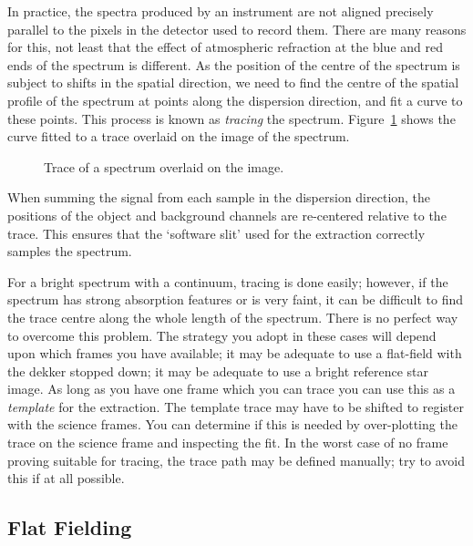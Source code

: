 \documentclass[twoside,11pt]{article}
\newcommand{\htmlref}[2]{#1}
\newcommand{\xlabel}[1]{}
\newcommand{\mlabel}[1]{\xlabel{#1}\label{#1}}
\newcommand{\scspec}[2]{#1}
\newcommand{\scspec}[2]{#2}
\begin{document}
In practice, the spectra produced by an instrument are not aligned
precisely parallel to the pixels in the detector used to record them.
There are many reasons for this, not least that the effect of
atmospheric refraction at the blue and red ends of the spectrum is
different.
As the position of the centre of the spectrum is subject to shifts in the
spatial direction, we need to find the centre of the spatial profile of
the spectrum at points along the dispersion direction, and fit
a curve to these points.
This process is known as {\em tracing} the spectrum.
\scspec{Figure~\ref{fi_order_trace}}{The figure below} shows the
curve fitted to a trace overlaid on the image of the spectrum.

\begin{figure}
\begin{center}
  \scspec{\leavevmode\epsfysize=105mm\epsfbox{sc7_05.eps}}
         {\leavevmode\epsfysize=136mm}

  \parbox{140mm}{
    \caption{Trace of a spectrum overlaid on the image.}
    \label{fi_order_trace}
  }
\end{center}
\end{figure}

When summing the signal from each sample in the dispersion direction, the
positions of the object and background channels are re-centered relative to
the trace.  This ensures that the `software slit' used for the extraction
correctly samples the spectrum.

For a bright spectrum with a \htmlref{continuum}{gl_continuum}, tracing is
done easily; however, if the spectrum has strong absorption features or is
very faint, it can be difficult to find the trace centre along the whole
length of the spectrum.
There is no perfect way to overcome this problem.
The strategy you adopt in these cases will depend upon which frames
you have available; it may be adequate to use a flat-field with the
\htmlref{dekker}{gl_dekker}
stopped down; it may be adequate to use a bright reference star image.
As long as you have one frame which you can trace you can use this
as a \htmlref{{\em template}}{gl_template_order} for the extraction.
The template trace may have to be shifted to register with the science frames.
You can determine if this is needed by over-plotting the trace on
the science frame and inspecting the fit.
In the worst case of no frame proving suitable for tracing, the trace
path may be defined manually; try to avoid this if at all possible.


\subsection{\mlabel{flat_fielding}Flat Fielding}
\end{document}
